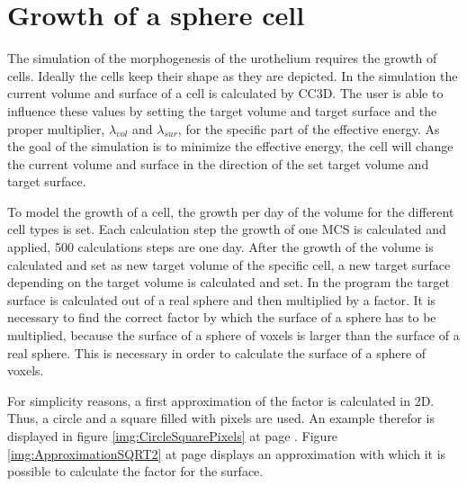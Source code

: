 \section{Growth of a sphere cell}\label{sec:GrowSphereCell}
The simulation of the morphogenesis of the urothelium requires the growth of cells. Ideally the cells keep their shape as they are depicted. \newline
In the simulation the current volume and surface of a cell is calculated by \ac{CC3D}. The user is able to influence these values by setting the target volume and target surface and the proper multiplier, $\lambda_{vol}$ and $\lambda_{sur}$, for the specific part of the effective energy. As the goal of the simulation is to minimize the effective energy, the cell will change the current volume and surface in the direction of the set target volume and target surface. 

To model the growth of a cell, the growth per day of the volume for the different cell types is set. Each calculation step the growth of one \ac{MCS} is calculated and applied, 500 calculations steps are one day. After the growth of the volume is calculated and set as new target volume of the specific cell, a new target surface depending on the target volume is calculated and set. \newline
In the program the target surface is calculated out of a real sphere and then multiplied by a factor.
It is necessary to find the correct factor by which the surface of a sphere has to be multiplied, because the surface of a sphere of voxels is larger than the surface of a real sphere. This is necessary in order to calculate the surface of a sphere of voxels. 

For simplicity reasons, a first approximation of the factor is calculated in 2D. Thus, a circle and a square filled with pixels are used. An example therefor is displayed in figure \ref{img:CircleSquarePixels} at page \pageref{img:CircleSquarePixels}. \newline
Figure \ref{img:ApproximationSQRT2} at page \pageref{img:ApproximationSQRT2} displays an approximation with which it is possible to calculate the factor for the surface. 

